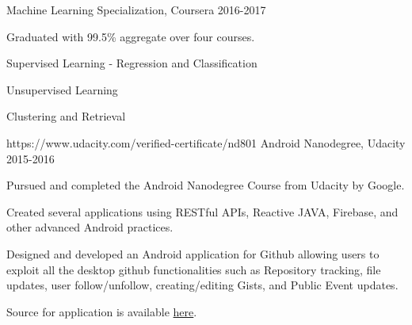\begin{cventries}
    {Machine Learning Specialization, Coursera}
    {}
    {2016-2017}
    { Graduated with 99.5\% aggregate over four courses. \linebreak
    \begin{cvitems}
    	\item{Supervised Learning - Regression and Classification}
        \item{Unsupervised Learning}
        \item{Clustering and Retrieval}
    \end{cvitems}
    }
   
  \cventry
    {https://www.udacity.com/verified-certificate/nd801}
    {Android Nanodegree, Udacity}
    {}
    {2015-2016}
    {Pursued and completed the Android Nanodegree Course from Udacity by Google. \linebreak
    \begin{cvitems}
    	\item{Created several applications using RESTful APIs, Reactive JAVA, Firebase, and other advanced Android practices.}
        \item{Designed and developed an Android application for Github allowing users to exploit all the desktop github functionalities such as Repository tracking, file updates, user follow/unfollow, creating/editing Gists, and Public Event updates.}
       \item{Source for application is available  \href{https://github.com/codeahead14/Android-Git-Client}{here}.}
    \end{cvitems}
    }
\end{cventries}

